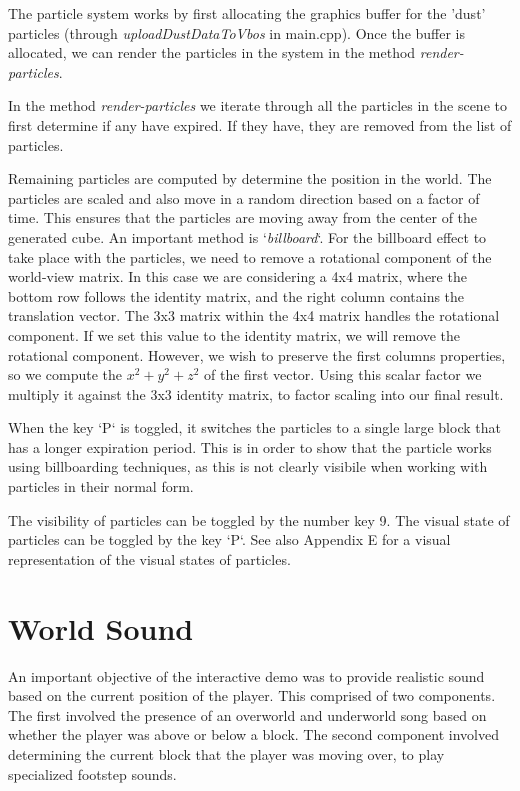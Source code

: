 \documentclass{book}
\begin{document}
The particle system works by first allocating the graphics buffer for the 'dust' particles (through \textit{uploadDustDataToVbos} in main.cpp).  Once the buffer is allocated, we can render the particles in the system in the method \textit{render-particles}.
    
In the method \textit{render-particles} we iterate through all the particles in the scene to first determine if any have expired.  If they have, they are removed from the list of particles.
    
Remaining particles are computed by determine the position in the world.  The particles are scaled and also move in a random direction based on a factor of time.  This ensures that the particles are moving away from the center of the generated cube.  An important method is `\textit{billboard}`.  For the billboard effect to take place with the particles, we need to remove a rotational component of the world-view matrix.  In this case we are considering a 4x4 matrix, where the bottom row follows the identity matrix, and the right column contains the translation vector.  The 3x3 matrix within the 4x4 matrix handles the rotational component.  If we set this value to the identity matrix, we will remove the rotational component.  However, we wish to preserve the first columns properties, so we compute the $x^2 + y^2 + z^2$ of the first vector.  Using this scalar factor we multiply it against the 3x3 identity matrix, to factor scaling into our final result.
    
When the key `P` is toggled, it switches the particles to a single large block that has a longer expiration period.  This is in order to show that the particle works using billboarding techniques, as this is not clearly visibile when working with particles in their normal form.
    
The visibility of particles can be toggled by the number key 9.  The visual state of particles can be toggled by the key `P`.  See also Appendix E for a visual representation of the visual states of particles.
    
\section{World Sound}
    
An important objective of the interactive demo was to provide realistic sound based on the current position of the player.  This comprised of two components.  The first involved the presence of an overworld and underworld song based on whether the player was above or below a block.   The second component involved determining the current block that the player was moving over, to play specialized footstep sounds.
    
\end{document}

